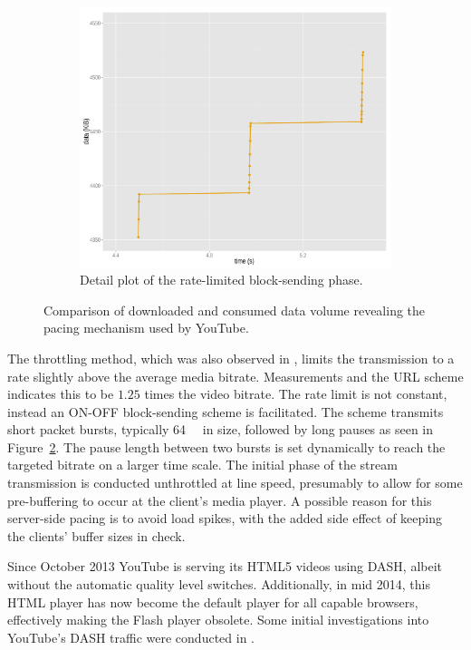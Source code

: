 \begin{figure}[htbp]
	\begin{subfigure}[b]{0.9\textwidth}
		\centering
		\includegraphics[width=\textwidth]{images/R-blocktransferdetail.pdf}
		\caption{Detail plot of the rate-limited block-sending phase.}
		\label{c3:fig:blocktransfer-detail}
	\end{subfigure}
\caption{Comparison of downloaded and consumed data volume revealing the pacing mechanism used by YouTube.}
\label{c3:fig:blocktransfer}
\end{figure}


The throttling method, which was also observed in \cite{alcock2011afcyt}, limits the transmission to a rate slightly above the average media bitrate. Measurements and the \gls{URL} scheme indicates this to be $1.25$ times the video bitrate. The rate limit is not constant, instead an ON-OFF block-sending scheme is facilitated. The scheme transmits short packet bursts, typically \SI{64}{\kibi\byte} in size, followed by long pauses as seen in Figure~\ref{c3:fig:blocktransfer}. The pause length between two bursts is set dynamically to reach the targeted bitrate on a larger time scale. The initial phase of the stream transmission is conducted unthrottled at line speed, presumably to allow for some pre-buffering to occur at the client's media player. A possible reason for this server-side pacing is to avoid load spikes, with the added side effect of keeping the clients' buffer sizes in check.

Since October 2013 YouTube is serving its \acrshort{HTML}5 videos using \gls{DASH}, albeit without the automatic quality level switches. Additionally, in mid 2014, this \acrshort{HTML} player has now become the default player for all capable browsers, effectively making the Flash player obsolete. Some initial investigations into YouTube's \gls{DASH} traffic were conducted in \cite{2014arXiv1408.5777A}.


